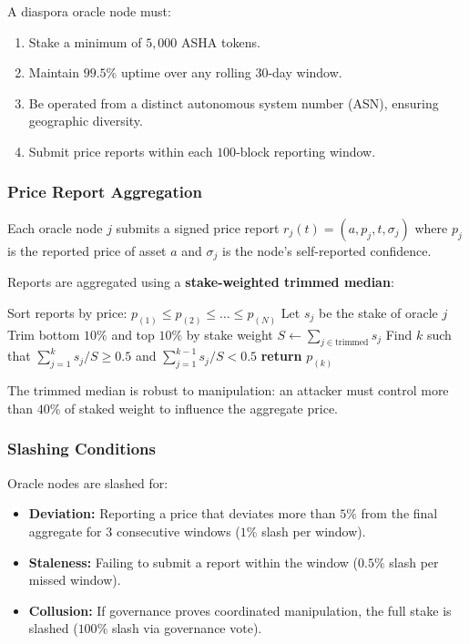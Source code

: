 \documentclass[11pt,a4paper]{article}
\newcommand{\asha}{\textsc{ASHA}\xspace}
\begin{document}
A diaspora oracle node must:
\begin{enumerate}
  \item Stake a minimum of $5{,}000$ \asha tokens.
  \item Maintain $99.5\%$ uptime over any rolling $30$-day window.
  \item Be operated from a distinct autonomous system number (ASN), ensuring geographic diversity.
  \item Submit price reports within each $100$-block reporting window.
\end{enumerate}

\subsubsection{Price Report Aggregation}

Each oracle node $j$ submits a signed price report $r_j(t) = (a, p_j, t, \sigma_j)$ where $p_j$ is the reported price of asset $a$ and $\sigma_j$ is the node's self-reported confidence.

Reports are aggregated using a \textbf{stake-weighted trimmed median}:

\begin{algorithm}[H]
\caption{Stake-Weighted Trimmed Median}
\label{alg:oracle}
\begin{algorithmic}[1]
  \State Sort reports by price: $p_{(1)} \leq p_{(2)} \leq \ldots \leq p_{(N)}$
  \State Let $s_j$ be the stake of oracle $j$
  \State Trim bottom $10\%$ and top $10\%$ by stake weight
  \State $S \gets \sum_{j \in \text{trimmed}} s_j$
  \State Find $k$ such that $\sum_{j=1}^{k} s_j / S \geq 0.5$ and $\sum_{j=1}^{k-1} s_j / S < 0.5$
  \State \textbf{return} $p_{(k)}$ 
\EndProcedure
\end{algorithmic}
\end{algorithm}

The trimmed median is robust to manipulation: an attacker must control more than $40\%$ of staked weight to influence the aggregate price.

\subsubsection{Slashing Conditions}

Oracle nodes are slashed for:
\begin{itemize}
  \item \textbf{Deviation:} Reporting a price that deviates more than $5\%$ from the final aggregate for $3$ consecutive windows ($1\%$ slash per window).
  \item \textbf{Staleness:} Failing to submit a report within the window ($0.5\%$ slash per missed window).
  \item \textbf{Collusion:} If governance proves coordinated manipulation, the full stake is slashed ($100\%$ slash via governance vote).
\end{itemize}
\end{document}
